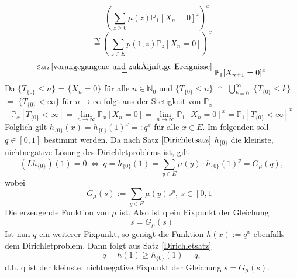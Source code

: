 \begin{equation*}
= (\sum_{z \geq 0} \mu(z) \mathbb{P}_{1}[X_{n} = 0]^{z})^{x}
\end{equation*}
\begin{equation*}
\stackrel{\mathrm{IV}}{=} (\sum_{z \in E} p(1,z) \mathbb{P}_{z}[X_{n} = 0])^{x}
\end{equation*}
\begin{equation*}
\stackrel{\mathrm{Satz} \: \ref{vorangegangene und zukünftige Ereignisse}}{=}   \mathbb{P}_{1}[X_{n+1} = 0]^{x}
\end{equation*}
Da $\lbrace T_{\lbrace 0 \rbrace} \leq n \rbrace$ = $\lbrace X_{n} = 0 \rbrace$ für alle $n \in \mathbb{N}_{0}$ und $\lbrace T_{\lbrace 0 \rbrace}  \leq n \rbrace$ $\uparrow$ $\bigcup_{k=0}^{\infty}$ $\lbrace T_{\lbrace 0 \rbrace} \leq k \rbrace$ $=$ $\lbrace T_{\lbrace 0 \rbrace} < \infty \rbrace$ für $n \to \infty$ folgt aus der Stetigkeit von $\mathbb{P}_{x}$
\begin{equation*}
\mathbb{P}_{x}[T_{\lbrace 0 \rbrace} < \infty] = \lim_{n \to \infty} \mathbb{P}_{x}[X_{n} = 0] = \lim_{n \to \infty} \mathbb{P}_{1}[X_{n} = 0]^{x} = \mathbb{P}_{1}[T_{\lbrace 0 \rbrace} < \infty]^{x}
\end{equation*}
Folglich gilt $h_{\lbrace 0 \rbrace}(x) = h_{\lbrace 0 \rbrace}(1)^{x} =: q^{x}$ für alle $x \in E$. Im folgenden soll $q \in [0,1]$ bestimmt werden. Da nach Satz $\ref{Dirichletsatz}$ $h_{\lbrace 0 \rbrace}$ die kleinste, nichtnegative Lösung des Dirichletproblems ist, gilt
\begin{equation*}
(Lh_{\lbrace 0 \rbrace})(1) = 0 \: \Leftrightarrow \: q = h_{\lbrace 0 \rbrace}(1) = \sum_{y \in E} \mu(y) \cdot  h_{\lbrace 0 \rbrace}(1)^{y} = G_{\mu}(q),
\end{equation*} 
wobei
\begin{equation*}
G_{\mu}(s) := \sum_{y \in E} \mu(y) s^{y}, \: s \in [0,1]
\end{equation*}
Die erzeugende Funktion von $\mu$ ist. Also ist q ein Fixpunkt der Gleichung
\begin{equation*}
s = G_{\mu}(s)
\end{equation*}
Ist nun $\overline{q}$ ein weiterer Fixpunkt, so genügt die Funktion $h(x) := \overline{q}^{x}$ ebenfalls dem Dirichletproblem. Dann folgt aus Satz \ref{Dirichletsatz}
\begin{equation*}
\overline{q} = h(1) \geq  h_{\lbrace 0 \rbrace}(1) = q,
\end{equation*}
d.h. q ist der kleinste, nichtnegative Fixpunkt der Gleichung $s = G_{\mu}(s)$.
